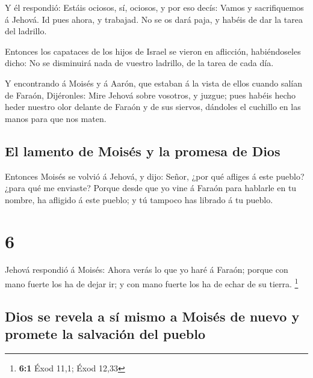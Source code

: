  Y él respondió: Estáis ociosos, sí, ociosos, y por eso
decís: Vamos y sacrifiquemos á Jehová.  Id pues ahora, y
trabajad. No se os dará paja, y habéis de dar la tarea del ladrillo.

 Entonces los capataces de los hijos de Israel se vieron
en aflicción, habiéndoseles dicho: No se disminuirá nada de vuestro
ladrillo, de la tarea de cada día.

 Y encontrando á Moisés y á Aarón, que estaban á la vista
de ellos cuando salían de Faraón,  Dijéronles: Mire
Jehová sobre vosotros, y juzgue; pues habéis hecho heder nuestro olor
delante de Faraón y de sus siervos, dándoles el cuchillo en las manos
para que nos maten.

\hypertarget{el-lamento-de-moisuxe9s-y-la-promesa-de-dios}{%
\subsection{El lamento de Moisés y la promesa de
Dios}\label{el-lamento-de-moisuxe9s-y-la-promesa-de-dios}}

 Entonces Moisés se volvió á Jehová, y dijo: Señor, ¿por
qué afliges á este pueblo? ¿para qué me enviaste?  Porque
desde que yo vine á Faraón para hablarle en tu nombre, ha afligido á
este pueblo; y tú tampoco has librado á tu pueblo.

\hypertarget{section-5}{%
\section{6}\label{section-5}}

 Jehová respondió á Moisés: Ahora verás lo que yo haré á
Faraón; porque con mano fuerte los ha de dejar ir; y con mano fuerte los
ha de echar de su tierra. \footnote{\textbf{6:1} Éxod 11,1; Éxod 12,33}

\hypertarget{dios-se-revela-a-suxed-mismo-a-moisuxe9s-de-nuevo-y-promete-la-salvaciuxf3n-del-pueblo}{%
\subsection{Dios se revela a sí mismo a Moisés de nuevo y promete la
salvación del
pueblo}\label{dios-se-revela-a-suxed-mismo-a-moisuxe9s-de-nuevo-y-promete-la-salvaciuxf3n-del-pueblo}}

